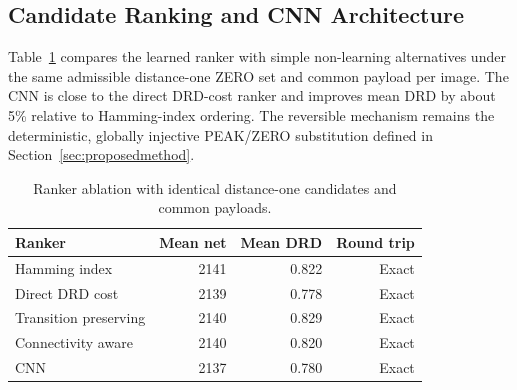 \begin{table}[t]
\centering
\caption{Central ablation of serialization-aware mapping activation on the
eight document images. Values are means in bits except DRD; the post-hoc value
in A0 is the net payload obtained when the exact wire is charged after the
gross-only selection.}
\label{tab:activation-ablation}
\end{table}

\subsection{Candidate Ranking and CNN Architecture}

Table~\ref{tab:ranker-ablation} compares the learned ranker with simple
non-learning alternatives under the same admissible distance-one ZERO set and
common payload per image. The CNN is close to the direct DRD-cost ranker and
improves mean DRD by about 5\% relative to Hamming-index ordering. The
reversible mechanism remains the deterministic, globally injective PEAK/ZERO
substitution defined in
Section~\ref{sec:proposedmethod}.

\begin{table}[t]
\centering
\caption{Ranker ablation with identical distance-one candidates and common
payloads.}
\label{tab:ranker-ablation}
\begin{tabular}{@{}lrrr@{}}
\toprule
\textbf{Ranker} & \textbf{Mean net} & \textbf{Mean DRD} &
\textbf{Round trip} \\
\midrule
Hamming index & 2141 & 0.822 & Exact \\
Direct DRD cost & 2139 & 0.778 & Exact \\
Transition preserving & 2140 & 0.829 & Exact \\
Connectivity aware & 2140 & 0.820 & Exact \\
CNN & 2137 & 0.780 & Exact \\
\bottomrule
\end{tabular}
\end{table}

